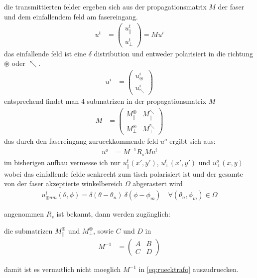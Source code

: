 \documentclass{article}
\begin{document}
die transmittierten felder ergeben sich aus der propagationsmatrix $M$
der faser und dem einfallendem feld am fasereingang.
\begin{align}
  u^t &= \begin{pmatrix}u^t_\parallel \\ u^t_\perp\end{pmatrix} = M u^i
\end{align}
das einfallende feld ist eine $\delta$ distribution und entweder
polarisiert in die richtung $\circledast$ oder $\nwarrow$.
\begin{align}
  u^i &= \begin{pmatrix}u^i_\circledast \\ u^i_\nwarrow\end{pmatrix}
\end{align}
entsprechend findet man 4 submatrizen in der propagationsmatrix $M$
\begin{align}
  M &= \begin{pmatrix}
    M^\circledast_\parallel & M^\nwarrow_\parallel \\
    M^\circledast_\perp & M^\nwarrow_\perp 
  \end{pmatrix}
\end{align}
das durch den fasereingang zurueckkommende feld $u^o$ ergibt sich aus:
\begin{align}
  \label{eq:ruecktrafo}
  u^o &= M^{-1} R_s M u^i
\end{align}
im bisherigen aufbau vermesse ich nur $u^t_\parallel(x',y')$,
$u^t_\perp(x',y')$ und $u^o_\perp(x,y)$ wobei das einfallende felde
senkrecht zum tisch polarisiert ist und der gesamte von der faser
akzeptierte winkelbereich $\Omega$ abgerastert wird
\begin{align}
  u^i_{\circledast nm}(\theta,\phi) = \delta(\theta-\theta_n)\ \delta(\phi-\phi_m) \quad \forall (\theta_n,\phi_m)\in\Omega
\end{align}
 

angenommen $R_s$ ist bekannt, dann werden zug\"anglich: 

die submatrizen $M^\circledast_\parallel$ und $M^\circledast_\perp$,
sowie $C$ und $D$ in
\begin{align}
  M^{-1} &=\begin{pmatrix}
    A & B \\ C& D
  \end{pmatrix}
\end{align}

damit ist es vermutlich nicht moeglich $M^{-1}$ in
\eqref{eq:ruecktrafo} auszudruecken.
\end{document}

